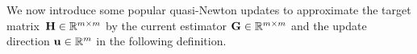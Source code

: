 \documentclass[11pt]{article}
\theoremstyle{plain}
\theoremstyle{definition}
\theoremstyle{remark}
\theoremstyle{plain}
\def\G{{\bf G}}
\def\H{{\bf H}}
\def\I{{\bf I}}
\def \J{{\bf J}}
\def\u{{\bf u}}
\def\x{{\bf x}}
\def\y{{\bf y}}
\def\RB{{\mathbb R}}
\begin{document}

We now introduce some popular quasi-Newton updates to approximate the target matrix~$\H\in\RB^{m\times m}$ by 
the current estimator $\G\in\RB^{m\times m}$ and the update direction $\u\in\RB^{m}$ in the following definition.
\end{document}
